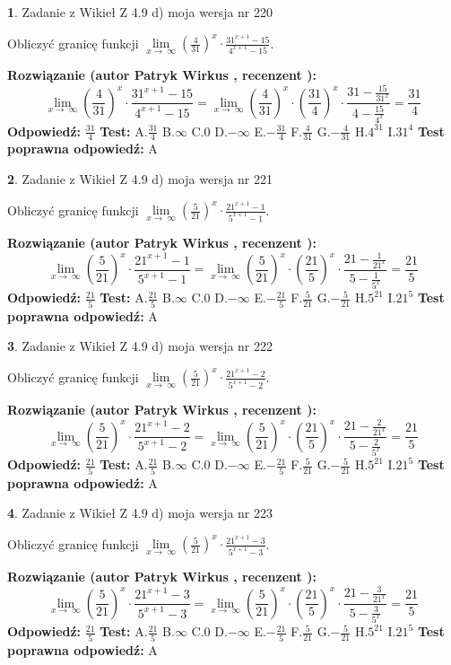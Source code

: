 \documentclass[12pt, a4paper]{article}
\theoremstyle{definition} %
\newtheorem{zad}{}
\newcommand{\zadStart}[1]{\begin{zad}#1\newline}
\newcommand{\zadStop}{\end{zad}}
\newcommand{\rozwStart}[2]{\noindent \textbf{Rozwiązanie (autor #1 , recenzent #2): }\newline}
\newcommand{\rozwStop}{\newline}
\newcommand{\odpStart}{\noindent \textbf{Odpowiedź:}\newline}
\newcommand{\odpStop}{\newline}
\newcommand{\testStart}{\noindent \textbf{Test:}\newline}
\newcommand{\testStop}{\newline}
\newcommand{\kluczStart}{\noindent \textbf{Test poprawna odpowiedź:}\newline}
\newcommand{\kluczStop}{\newline}
\begin{document}
\zadStart{Zadanie z Wikieł Z 4.9 d) moja wersja nr 220}


Obliczyć granicę funkcji  $\lim\limits_{x\to\ \infty}(\frac{4}{31})^{x}\cdot\frac{31^{x+1}-15}{4^{x+1}-15}$.
\zadStop
\rozwStart{Patryk Wirkus}{}
$$\lim\limits_{x\to\ \infty}(\frac{4}{31})^{x}\cdot\frac{31^{x+1}-15}{4^{x+1}-15}=\lim\limits_{x\to\ \infty}(\frac{4}{31})^{x}\cdot(\frac{31}{4})^{x} \cdot \frac{31-\frac{15}{31^{x}}}{4-\frac{15}{4^{x}}} = \frac{31}{4}$$
\rozwStop
\odpStart
$\frac{31}{4}$
\odpStop
\testStart
A.$\frac{31}{4}$ B.$\infty$ C.$0$ D.$-\infty$ E.$-\frac{31}{4}$
F.$\frac{4}{31}$ G.$-\frac{4}{31}$
H.$4^{31}$
I.$31^{4}$
\testStop
\kluczStart
A
\kluczStop



\zadStart{Zadanie z Wikieł Z 4.9 d) moja wersja nr 221}


Obliczyć granicę funkcji  $\lim\limits_{x\to\ \infty}(\frac{5}{21})^{x}\cdot\frac{21^{x+1}-1}{5^{x+1}-1}$.
\zadStop
\rozwStart{Patryk Wirkus}{}
$$\lim\limits_{x\to\ \infty}(\frac{5}{21})^{x}\cdot\frac{21^{x+1}-1}{5^{x+1}-1}=\lim\limits_{x\to\ \infty}(\frac{5}{21})^{x}\cdot(\frac{21}{5})^{x} \cdot \frac{21-\frac{1}{21^{x}}}{5-\frac{1}{5^{x}}} = \frac{21}{5}$$
\rozwStop
\odpStart
$\frac{21}{5}$
\odpStop
\testStart
A.$\frac{21}{5}$ B.$\infty$ C.$0$ D.$-\infty$ E.$-\frac{21}{5}$
F.$\frac{5}{21}$ G.$-\frac{5}{21}$
H.$5^{21}$
I.$21^{5}$
\testStop
\kluczStart
A
\kluczStop



\zadStart{Zadanie z Wikieł Z 4.9 d) moja wersja nr 222}


Obliczyć granicę funkcji  $\lim\limits_{x\to\ \infty}(\frac{5}{21})^{x}\cdot\frac{21^{x+1}-2}{5^{x+1}-2}$.
\zadStop
\rozwStart{Patryk Wirkus}{}
$$\lim\limits_{x\to\ \infty}(\frac{5}{21})^{x}\cdot\frac{21^{x+1}-2}{5^{x+1}-2}=\lim\limits_{x\to\ \infty}(\frac{5}{21})^{x}\cdot(\frac{21}{5})^{x} \cdot \frac{21-\frac{2}{21^{x}}}{5-\frac{2}{5^{x}}} = \frac{21}{5}$$
\rozwStop
\odpStart
$\frac{21}{5}$
\odpStop
\testStart
A.$\frac{21}{5}$ B.$\infty$ C.$0$ D.$-\infty$ E.$-\frac{21}{5}$
F.$\frac{5}{21}$ G.$-\frac{5}{21}$
H.$5^{21}$
I.$21^{5}$
\testStop
\kluczStart
A
\kluczStop



\zadStart{Zadanie z Wikieł Z 4.9 d) moja wersja nr 223}


Obliczyć granicę funkcji  $\lim\limits_{x\to\ \infty}(\frac{5}{21})^{x}\cdot\frac{21^{x+1}-3}{5^{x+1}-3}$.
\zadStop
\rozwStart{Patryk Wirkus}{}
$$\lim\limits_{x\to\ \infty}(\frac{5}{21})^{x}\cdot\frac{21^{x+1}-3}{5^{x+1}-3}=\lim\limits_{x\to\ \infty}(\frac{5}{21})^{x}\cdot(\frac{21}{5})^{x} \cdot \frac{21-\frac{3}{21^{x}}}{5-\frac{3}{5^{x}}} = \frac{21}{5}$$
\rozwStop
\odpStart
$\frac{21}{5}$
\odpStop
\testStart
A.$\frac{21}{5}$ B.$\infty$ C.$0$ D.$-\infty$ E.$-\frac{21}{5}$
F.$\frac{5}{21}$ G.$-\frac{5}{21}$
H.$5^{21}$
I.$21^{5}$
\testStop
\kluczStart
A
\kluczStop
\end{document}
